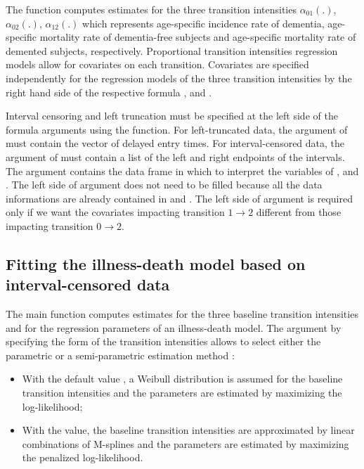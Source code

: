\documentclass[article]{jss}
\begin{document}
The function  computes estimates for the three transition
intensities \(\alpha_{01}(.)\), \(\alpha_{02}(.)\), \(\alpha_{12}(.)\) which
represents age-specific incidence rate of dementia, age-specific mortality
rate of dementia-free subjects and age-specific mortality rate of
demented subjects, respectively.  Proportional transition intensities
regression models allow for covariates on each transition.
Covariates are specified independently for the regression models of
the three transition intensities by the right hand side of the
respective formula ,  and
.

Interval censoring and left truncation must be specified at the left
side of the formula arguments using the  function.  For
left-truncated data, the  argument of  must
contain the vector of delayed entry times.  For interval-censored
data, the  argument of  must contain a list of
the left and right endpoints of the intervals.
The  argument contains the data frame in which to
interpret the variables of ,  and
.
The left side of  argument does not need to be filled because all the data 
informations are already contained in  and .
The left side of  argument is required only if we want the covariates 
impacting 
transition \(1 \rightarrow 2\) different from those impacting transition 
\(0 \rightarrow 2\).

\subsection{Fitting the illness-death model based on interval-censored data}
\label{sec-5-3}

The main function  computes estimates for the three baseline
transition intensities and for the regression parameters of an
illness-death model.  The  argument by specifying
the form of the transition intensities allows to select either the
parametric or a semi-parametric estimation method :

\begin{itemize}
\item With the default value , a Weibull distribution is
assumed for the baseline transition intensities and the parameters
are estimated by maximizing the log-likelihood;
\item With the  value, the baseline transition
intensities are approximated by linear combinations of
M-splines and the parameters are estimated by
maximizing the penalized log-likelihood.
\end{itemize}
\end{document}
